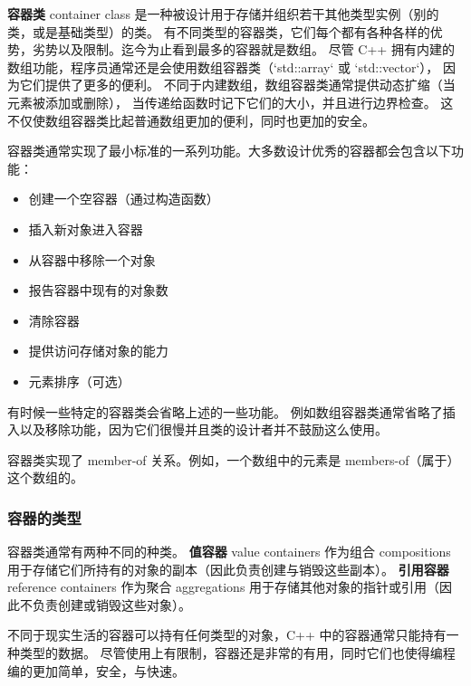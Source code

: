 \documentclass[../../LearnCpp.tex]{subfiles}
\begin{document}

\textbf{容器类} container class 是一种被设计用于存储并组织若干其他类型实例（别的类，或是基础类型）的类。
有不同类型的容器类，它们每个都有各种各样的优势，劣势以及限制。迄今为止看到最多的容器就是数组。
尽管 C++ 拥有内建的数组功能，程序员通常还是会使用数组容器类（`std::array` 或 `std::vector`），
因为它们提供了更多的便利。
不同于内建数组，数组容器类通常提供动态扩缩（当元素被添加或删除），
当传递给函数时记下它们的大小，并且进行边界检查。
这不仅使数组容器类比起普通数组更加的便利，同时也更加的安全。

容器类通常实现了最小标准的一系列功能。大多数设计优秀的容器都会包含以下功能：

\begin{itemize}
  \item 创建一个空容器（通过构造函数）
  \item 插入新对象进入容器
  \item 从容器中移除一个对象
  \item 报告容器中现有的对象数
  \item 清除容器
  \item 提供访问存储对象的能力
  \item 元素排序（可选）
\end{itemize}

有时候一些特定的容器类会省略上述的一些功能。
例如数组容器类通常省略了插入以及移除功能，因为它们很慢并且类的设计者并不鼓励这么使用。

容器类实现了 member-of 关系。例如，一个数组中的元素是 members-of（属于）这个数组的。

\subsubsection*{容器的类型}

容器类通常有两种不同的种类。
\textbf{值容器} value containers 作为组合 compositions 用于存储它们所持有的对象的副本（因此负责创建与销毁这些副本）。
\textbf{引用容器} reference containers 作为聚合 aggregations 用于存储其他对象的指针或引用（因此不负责创建或销毁这些对象）。

不同于现实生活的容器可以持有任何类型的对象，C++ 中的容器通常只能持有一种类型的数据。
尽管使用上有限制，容器还是非常的有用，同时它们也使得编程编的更加简单，安全，与快速。
\end{document}
